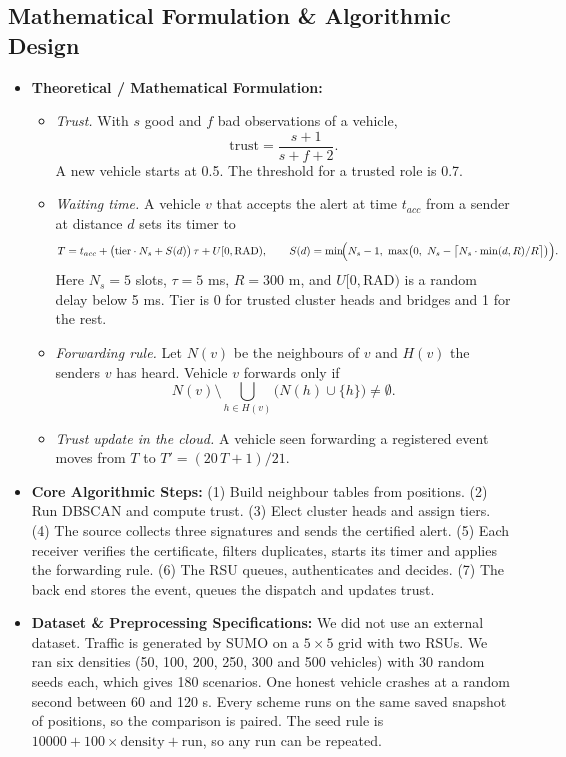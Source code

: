 \documentclass[11pt, a4paper]{article}
\begin{document}
\subsection{Mathematical Formulation \& Algorithmic Design}
\begin{itemize}[noitemsep, topsep=2pt]
    \item \textbf{Theoretical / Mathematical Formulation:}
    \begin{itemize}[noitemsep, topsep=1pt]
        \item \emph{Trust.} With $s$ good and $f$ bad observations of a vehicle,
        \[ \mathrm{trust} = \frac{s+1}{s+f+2}. \]
        A new vehicle starts at 0.5. The threshold for a trusted role is 0.7.
        \item \emph{Waiting time.} A vehicle $v$ that accepts the alert at time $t_{acc}$ from a sender at distance $d$ sets its timer to
        \[ T = t_{acc} + \bigl(\mathrm{tier}\cdot N_s + S(d)\bigr)\,\tau + U[0,\mathrm{RAD}), \qquad
           S(d) = \min\!\Bigl(N_s-1,\ \max\bigl(0,\ N_s - \bigl\lceil N_s \cdot \min(d,R)/R \bigr\rceil \bigr)\Bigr). \]
        Here $N_s = 5$ slots, $\tau = 5$ ms, $R = 300$ m, and $U[0,\mathrm{RAD})$ is a random delay below 5 ms. Tier is 0 for trusted cluster heads and bridges and 1 for the rest.
        \item \emph{Forwarding rule.} Let $N(v)$ be the neighbours of $v$ and $H(v)$ the senders $v$ has heard. Vehicle $v$ forwards only if
        \[ N(v) \setminus \bigcup_{h \in H(v)} \bigl(N(h) \cup \{h\}\bigr) \neq \emptyset . \]
        \item \emph{Trust update in the cloud.} A vehicle seen forwarding a registered event moves from $T$ to $T' = (20\,T + 1)/21$.
    \end{itemize}
    \item \textbf{Core Algorithmic Steps:} (1) Build neighbour tables from positions. (2) Run DBSCAN and compute trust. (3) Elect cluster heads and assign tiers. (4) The source collects three signatures and sends the certified alert. (5) Each receiver verifies the certificate, filters duplicates, starts its timer and applies the forwarding rule. (6) The RSU queues, authenticates and decides. (7) The back end stores the event, queues the dispatch and updates trust.
    \item \textbf{Dataset \& Preprocessing Specifications:} We did not use an external dataset. Traffic is generated by SUMO \cite{lopez2018} on a $5\times5$ grid with two RSUs. We ran six densities (50, 100, 200, 250, 300 and 500 vehicles) with 30 random seeds each, which gives 180 scenarios. One honest vehicle crashes at a random second between 60 and 120 s. Every scheme runs on the same saved snapshot of positions, so the comparison is paired. The seed rule is $10000 + 100 \times \mathrm{density} + \mathrm{run}$, so any run can be repeated.

\end{itemize}
\end{document}
